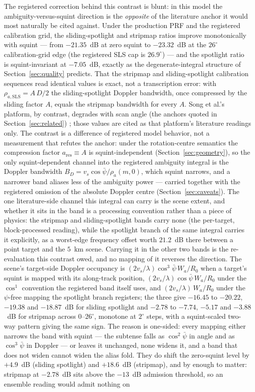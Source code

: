 \documentclass[preprint,authoryear]{elsarticle}
\begin{document}
The registered correction behind this contrast is blunt: in this model the ambiguity-versus-squint direction is the \emph{opposite} of the literature anchor it would most naturally be cited against. Under the production PRF and the registered calibration grid, the sliding-spotlight and stripmap ratios improve monotonically with squint --- from $-21.35$~dB at zero squint to $-23.32$~dB at the $26^{\circ}$ calibration-grid edge (the registered SLS cap is $26.9^{\circ}$) --- and the spotlight ratio is squint-invariant at $-7.05$~dB, exactly as the degenerate-integral structure of Section~\ref{sec:quality} predicts. That the stripmap and sliding-spotlight calibration sequences read identical values is exact, not a transcription error: with $\rho_{a,\mathrm{SLS}}=A\,D/2$ the sliding-spotlight Doppler bandwidth, once compressed by the sliding factor $A$, equals the stripmap bandwidth for every $A$. Song et al.'s platform, by contrast, degrades with scan angle (the anchors quoted in Section~\ref{sec:related}) \citep{song2025spaceborne}; those values are cited as that platform's literature readings only. The contrast is a difference of registered model behavior, not a measurement that refutes the anchor: under the rotation-centre semantics the compression factor $a_{\mathrm{res}}\equiv A$ is squint-independent (Section~\ref{sec:geometry}), so the only squint-dependent channel into the registered ambiguity integral is the Doppler bandwidth $B_D=v_s\cos\bar\psi/\rho_a(m,0)$, which squint narrows, and a narrower band aliases less of the ambiguity power --- carried together with the registered omission of the absolute Doppler centre (Section~\ref{sec:caveats}). The one literature-side channel this integral can carry is the scene extent, and whether it sits in the band is a processing convention rather than a piece of physics: the stripmap and sliding-spotlight bands carry none (the per-target, block-processed reading), while the spotlight branch of the same integral carries it explicitly, as a worst-edge frequency offset worth $21.2$~dB there between a point target and the $5$~km scene. Carrying it in the other two bands is the re-evaluation this contrast owed, and no mapping of it reverses the direction. The scene's target-side Doppler occupancy is $(2v_s/\lambda)\cos^3\bar\psi\,W_a/R_0$ when a target's squint is mapped with its along-track position, $(2v_s/\lambda)\cos\bar\psi\,W_a/R_0$ under the $\cos^1$ convention the registered band itself uses, and $(2v_s/\lambda)\,W_a/R_0$ under the $\psi$-free mapping the spotlight branch registers; the three give $-16.45$ to $-20.22$, $-19.38$ and $-18.87$~dB for sliding spotlight and $-2.78$ to $-7.74$, $-5.17$ and $-3.88$~dB for stripmap across $0$--$26^{\circ}$, monotone at $2^{\circ}$ steps, with a squint-scaled two-way pattern giving the same sign. The reason is one-sided: every mapping either narrows the band with squint --- the subtense falls as $\cos^2\bar\psi$ in angle and as $\cos^3\bar\psi$ in Doppler --- or leaves it unchanged, none widens it, and a band that does not widen cannot widen the alias fold. They do shift the zero-squint level by $+4.9$~dB (sliding spotlight) and $+18.6$~dB (stripmap), and by enough to matter: stripmap at $-2.78$~dB sits above the $-13$~dB admission threshold, so an ensemble reading would admit nothing on 
\end{document}
